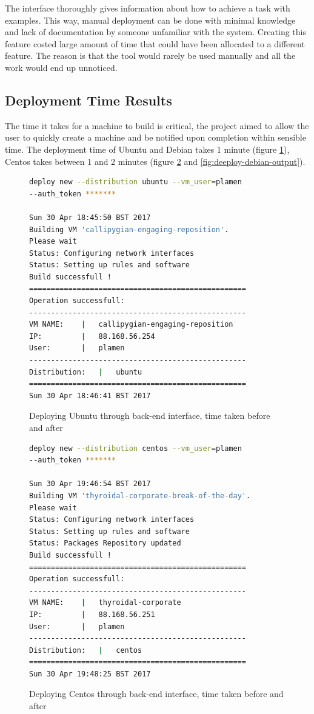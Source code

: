 \documentclass{article}
\begin{document}
The interface thoroughly gives information about how to achieve a task with examples. This way, manual deployment can be done with minimal knowledge and lack of documentation by someone unfamiliar with the system. Creating this feature costed large amount of time that could have been allocated to a different feature. The reason is that the tool would rarely be used manually and all the work would end up unnoticed.

\subsection{Deployment Time Results}
The time it takes for a machine to build is critical, the project aimed to allow the user to quickly create a machine and be notified upon completion within sensible time. The deployment time of Ubuntu and Debian takes 1 minute (figure \ref{fig:deeploy-ubuntu-output}), Centos takes between 1 and 2 minutes (figure \ref{fig:deeploy-centos-output} and  \ref{fig:deeploy-debian-output}).

\begin{figure}[H]
\begin{lstlisting}[frame=single, language=Bash]
deploy new --distribution ubuntu --vm_user=plamen
--auth_token *******

Sun 30 Apr 18:45:50 BST 2017
Building VM 'callipygian-engaging-reposition'.
Please wait
Status: Configuring network interfaces
Status: Setting up rules and software
Build successfull !
==================================================
Operation successfull:
--------------------------------------------------
VM NAME:	|	callipygian-engaging-reposition
IP:			|	88.168.56.254
User:		|	plamen
--------------------------------------------------
Distribution:	|	ubuntu
==================================================
Sun 30 Apr 18:46:41 BST 2017
\end{lstlisting}
\caption{Deploying Ubuntu through back-end interface, time taken before and after}
\label{fig:deeploy-ubuntu-output}
\end{figure}

\begin{figure}
\begin{lstlisting}[frame=single, language=Bash]
deploy new --distribution centos --vm_user=plamen
--auth_token *******

Sun 30 Apr 19:46:54 BST 2017
Building VM 'thyroidal-corporate-break-of-the-day'.
Please wait
Status: Configuring network interfaces
Status: Setting up rules and software
Status: Packages Repository updated
Build successfull !
==================================================
Operation successfull:
--------------------------------------------------
VM NAME:    |	thyroidal-corporate
IP:			|	88.168.56.251
User:		|	plamen
--------------------------------------------------
Distribution:	|	centos
==================================================
Sun 30 Apr 19:48:25 BST 2017

\end{lstlisting}
\caption{Deploying Centos through back-end interface, time taken before and after}
\label{fig:deeploy-centos-output}
\end{figure}
\end{document}

